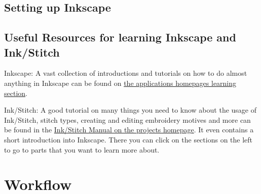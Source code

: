 \documentclass{article}
\begin{document}
        \subsection{Setting up Inkscape}

        \subsection{Useful Resources for learning Inkscape and Ink/Stitch}

        Inkscape:\newline
        A vast collection of introductions and tutorials on how to do almost anything in Inkscape can be found on \href{https://inkscape.org/learn/}{the applications homepages learning section}.

        Ink/Stitch:\newline
        A good tutorial on many things you need to know about the usage of Ink/Stitch, stitch types, creating and editing embroidery motives and more can be found in the \href{https://inkstitch.org/docs/customize/}{Ink/Stitch Manual on the projects homepage}.
        It even contains a short introduction into Inkscape. There you can click on the sections on the left to go to parts that you want to learn more about.

    \pagebreak

    \section{Workflow}
\end{document}
